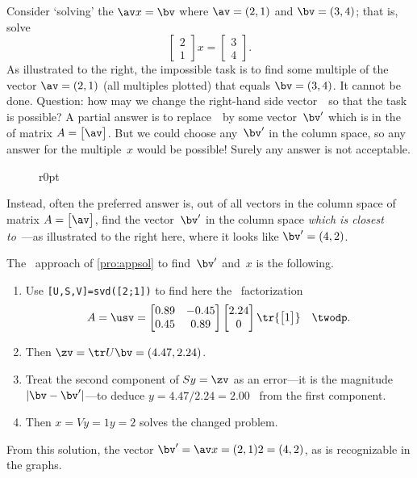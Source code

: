 \begin{example} \label{eg:incon1}
Consider `solving' the  \(\av x=\bv\) where \(\av=(2,1)\) and \(\bv=(3,4)\); that is, solve
\begin{equation*}
\begin{bmatrix} 2\\1 \end{bmatrix}x=\begin{bmatrix} 3\\4 \end{bmatrix}.
\end{equation*}
As illustrated to the right, the impossible task is to find some multiple of the vector \(\av=(2,1)\) (all multiples plotted) that equals \(\bv=(3,4)\).
It cannot be done.
Question: how may we change the right-hand side vector~\bv\ so that the task is possible?  
A partial answer is to replace~\bv\ by some vector~\(\bv'\) which is in the  of matrix \(A=\begin{bmatrix} \av \end{bmatrix}\).
But we could choose any~\(\bv'\) in the column space, so any answer for the multiple~\(x\) would be possible! Surely any answer is not acceptable.

\begin{figure}r{0pt}  \end{figure}
Instead, often the preferred answer is, out of all vectors in the column space of matrix \(A=\begin{bmatrix} \av \end{bmatrix}\),  find the vector~\(\bv'\) in the column space \emph{which is closest to}~\bv---as illustrated to the right here, where it looks like \(\bv'=(4,2)\).

The \svd\ approach of \cref{pro:appsol} to find~\(\bv'\) and~\(x\) is the following.
\begin{enumerate}%
\item Use \verb|[U,S,V]=svd([2;1])| to find here the \svd\ factorization \begin{equation*}
A=\usv=\begin{bmatrix} 0.89&-0.45\\0.45&0.89 \end{bmatrix} \begin{bmatrix} 2.24\\0 \end{bmatrix}\tr{\begin{bmatrix} 1 \end{bmatrix}}\quad \twodp.
\end{equation*}
\item Then \(\zv=\tr U\bv=(4.47,2.24)\).
\item Treat the second component of \(Sy=\zv\) as an error---it is the magnitude \(|\bv-\bv'|\)---to deduce \(y=4.47/2.24=2.00\) \twodp\ from the first component.
\item Then  \(x=Vy=1y=2\) solves the changed problem.
\end{enumerate}
From this solution, the vector \(\bv'=\av x=(2,1)2=(4,2)\), as is recognizable in the graphs.
\end{example}


